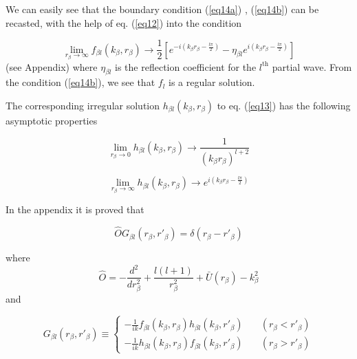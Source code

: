 We can easily see that the boundary condition (\ref{eq14a}) , (\ref{eq14b}) can be recasted, with the help of eq. (\ref{eq12}) into the condition

 \begin{equation}\label{eq15}
\lim_{r_\beta \rightarrow \infty} f_{\beta l}( k_ \beta, r_ \beta) \longrightarrow
\frac{1}{2}\left[ e^{-i  (k_ \beta r_ \beta -\frac{l\pi}{2})}-\eta_{\beta l}e^{i  (k_ \beta r_ \beta -\frac{l\pi}{2})}\right]
\end{equation}
(see Appendix)
where $\eta_{\beta l}$ is the reflection coefficient for the $l^{\text{th}}$ partial wave. From the condition (\ref{eq14b}), we see that $f_l$ is a regular solution.


The corresponding irregular solution $h_{\beta l}( k_ \beta, r_ \beta)$ to eq. (\ref{eq13}) has the following asymptotic properties


 \begin{equation}\label{eq16}
\lim_{r_\beta \rightarrow 0} h_{\beta l}( k_ \beta, r_ \beta) \longrightarrow
\frac{1}{(k_ \beta r_ \beta)^{l+2}}
\end{equation}

 \begin{equation}\label{eq17}
\lim_{r_\beta \rightarrow \infty} h_{\beta l}( k_ \beta, r_ \beta) \longrightarrow
e^{i(k_ \beta r_ \beta -\frac{l\pi}{2})}
\end{equation}

In the appendix it is proved that

 \begin{equation}\label{eq18}
\hat O G_{\beta l} ( r_ \beta, r'_ \beta)=\delta(r_ \beta-r'_ \beta)
\end{equation}

where
 \begin{equation}\label{eq19}
\hat O=-\frac{d^2}{dr^2_\beta}+\frac{l(l+1)}{r^2_\beta}+\bar U (r_ \beta)-k_\beta^2
\end{equation}
and

 \begin{equation}\label{eq20}
G_{\beta l} ( r_ \beta, r'_ \beta) \equiv \left \lbrace \begin{aligned}
-\frac{1}{ik} f_{\beta l}( k_ \beta, r_ \beta) h_{\beta l}( k_ \beta, r'_ \beta) &\quad( r_ \beta< r'_ \beta)\\
-\frac{1}{ik} h_{\beta l}( k_ \beta, r_ \beta) f_{\beta l}( k_ \beta, r'_ \beta) &\quad( r_ \beta>r'_ \beta)
\end{aligned}
\right.
\end{equation}


